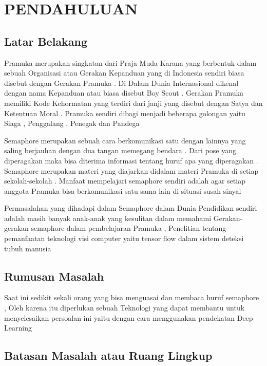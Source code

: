 \section{PENDAHULUAN}

\subsection{Latar Belakang}

Pramuka merupakan singkatan dari Praja Muda Karana yang berbentuk dalam sebuah Organisasi atau Gerakan Kepanduan yang di Indonesia sendiri biasa disebut dengan Gerakan Pramuka . Di Dalam Dunia Internasional dikenal dengan nama Kepanduan atau biasa disebut Boy Scout . Gerakan Pramuka memiliki Kode Kehormatan yang terdiri dari janji yang disebut dengan Satya dan Ketentuan Moral . Pramuka sendiri dibagi menjadi beberapa golongan yaitu Siaga , Penggalang , Penegak dan Pandega 
 

 Semaphore merupakan sebuah cara berkomunikasi satu dengan lainnya yang saling berjauhan dengan dua tangan memegang bendara . Dari pose yang diperagakan maka bisa diterima informasi tentang huruf apa yang diperagakan . Semaphore merupakan materi yang diajarkan didalam materi Pramuka di setiap sekolah-sekolah . Manfaat mempelajari semaphore sendiri adalah agar setiap anggota Pramuka bisa berkomunikasi satu sama lain di situasi susah sinyal 

 Permasalahan yang dihadapi dalam Semaphore dalam Dunia Pendidikan sendiri adalah masih banyak anak-anak yang kesulitan dalam memahami Gerakan-gerakan semaphore dalam pembelajaran Pramuka , Penelitian tentang pemanfaatan teknologi visi computer yaitu tensor flow dalam sistem deteksi tubuh manusia


\subsection{Rumusan Masalah}

Saat ini sedikit sekali orang yang bisa menguasai dan membaca huruf semaphore , Oleh karena itu diperlukan sebuah Teknologi yang dapat membantu untuk menyelesaikan persoalan ini yaitu dengan cara menggunakan pendekatan Deep Learning 


\subsection{Batasan Masalah atau Ruang Lingkup}

